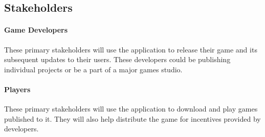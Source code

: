 
\subsection{Stakeholders}

\paragraph{Game Developers}
These primary stakeholders will use the application to release their game and its subsequent updates to their users. These developers could be publishing individual projects or be a part of a major games studio.

\paragraph{Players}
These primary stakeholders will use the application to download and play games published to it. They will also help distribute the game for incentives provided by developers.

